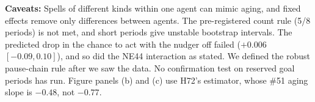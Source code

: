 \textbf{Caveats:} Spells of different kinds within one agent can mimic aging, and fixed effects remove only differences between agents. The pre-registered count rule (5/8 periods) is not met, and short periods give unstable bootstrap intervals. The predicted drop in the chance to act with the nudger off failed ($+0.006$ $[-0.09, 0.10]$), and so did the NE44 interaction as stated. We defined the robust pause-chain rule after we saw the data. No confirmation test on reserved goal periods has run. Figure panels (b) and (c) use H72's estimator, whose \#51 aging slope is $-0.48$, not $-0.77$.
